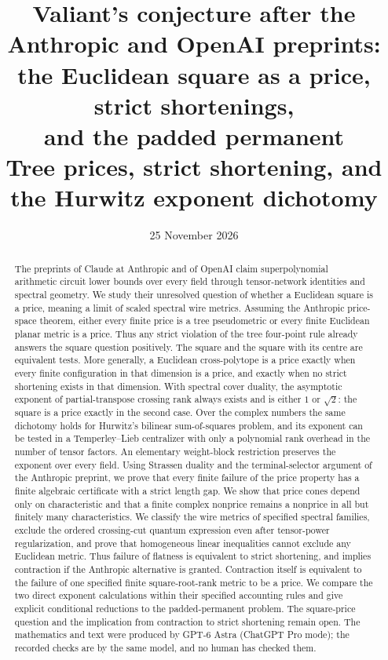 \documentclass[11pt,a4paper]{article}
\title{Valiant's conjecture after the Anthropic and OpenAI preprints:\\
the Euclidean square as a price, strict shortenings,\\
and the padded permanent\\[6pt]
\large Tree prices, strict shortening, and the Hurwitz exponent dichotomy}
\author{}
\date{25 November 2026}
\theoremstyle{definition}
\theoremstyle{remark}
\begin{document}
\maketitle
\begin{abstract}
The preprints of Claude at Anthropic and of OpenAI claim
superpolynomial arithmetic circuit lower bounds over every field
through tensor-network identities and spectral geometry.
We study their unresolved question of whether a Euclidean square
is a price, meaning a limit of scaled spectral wire metrics.
Assuming the Anthropic price-space theorem, either every finite
price is a tree pseudometric or every finite Euclidean planar metric is
a price. Thus any strict violation of the tree four-point rule
already answers the square question positively.
The square and the square with its centre are equivalent tests.
More generally, a Euclidean cross-polytope is a price exactly
when every finite configuration in that dimension is a price,
and exactly when no strict shortening exists in that dimension.
With spectral cover duality, the asymptotic exponent of
partial-transpose crossing rank always exists and is either
$1$ or $\sqrt2$: the square is a price exactly in the second case.
Over the complex numbers the same dichotomy holds for
Hurwitz's bilinear sum-of-squares problem, and its exponent can
be tested in a Temperley--Lieb centralizer with only a polynomial
rank overhead in the number of tensor factors. An elementary weight-block
restriction preserves the exponent over every field.
Using Strassen duality and the terminal-selector argument of
the Anthropic preprint, we prove that every finite failure of
the price property has a finite algebraic certificate with a
strict length gap. We show that price cones depend only on
characteristic and that a finite complex nonprice remains a
nonprice in all but finitely many characteristics.
We classify the wire metrics of specified spectral families,
exclude the ordered crossing-cut quantum expression even after
tensor-power regularization, and prove
that homogeneous linear inequalities cannot exclude any
Euclidean metric.
Thus failure of flatness is equivalent to strict shortening,
and implies contraction if the Anthropic alternative is granted.
Contraction itself is equivalent to the failure of one specified
finite square-root-rank metric to be a price.
We compare the two direct exponent calculations within their
specified accounting rules and give explicit conditional
reductions to the padded-permanent problem.
The square-price question and the implication from contraction
to strict shortening remain open.
The mathematics and text were produced by GPT-6 Astra (ChatGPT Pro mode);
the recorded checks are by the same model, and no human has checked them.
\end{abstract}
\end{document}
